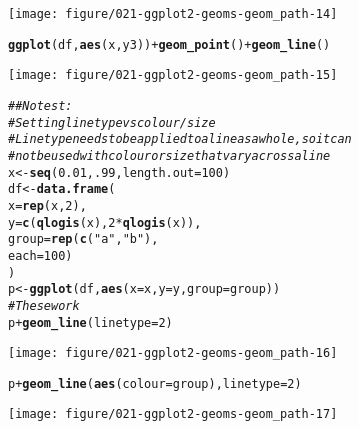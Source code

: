 \documentclass[a4paper,titlepage]{tufte-handout}\usepackage[]{graphicx}\usepackage[]{color}
\makeatletter
\def\maxwidth{ %
  \ifdim\Gin@nat@width>\linewidth
    \linewidth
  \else
    \Gin@nat@width
  \fi
}
\newcommand{\hlnum}[1]{\textcolor[rgb]{0.686,0.059,0.569}{#1}}%
\newcommand{\hlstr}[1]{\textcolor[rgb]{0.192,0.494,0.8}{#1}}%
\newcommand{\hlcom}[1]{\textcolor[rgb]{0.678,0.584,0.686}{\textit{#1}}}%
\newcommand{\hlopt}[1]{\textcolor[rgb]{0,0,0}{#1}}%
\newcommand{\hlstd}[1]{\textcolor[rgb]{0.345,0.345,0.345}{#1}}%
\newcommand{\hlkwb}[1]{\textcolor[rgb]{0.69,0.353,0.396}{#1}}%
\newcommand{\hlkwc}[1]{\textcolor[rgb]{0.333,0.667,0.333}{#1}}%
\newcommand{\hlkwd}[1]{\textcolor[rgb]{0.737,0.353,0.396}{\textbf{#1}}}%
\newenvironment{kframe}{%
 \def\at@end@of@kframe{}%
 \ifinner\ifhmode%
  \def\at@end@of@kframe{\end{minipage}}%
  \begin{minipage}{\columnwidth}%
 \fi\fi%
 \def\FrameCommand##1{\hskip\@totalleftmargin \hskip-\fboxsep
 \colorbox{shadecolor}{##1}\hskip-\fboxsep
     \hskip-\linewidth \hskip-\@totalleftmargin \hskip\columnwidth}%
 \MakeFramed {\advance\hsize-\width
   \@totalleftmargin\z@ \linewidth\hsize
   \@setminipage}}%
 {\par\unskip\endMakeFramed%
 \at@end@of@kframe}
\newenvironment{knitrout}{}{} %
\makeatother
\begin{document}
\begin{knitrout}
\begin{kframe}
{\ttfamily\noindent\color{warningcolor}{\#\# Warning: Removed 1 rows containing missing values (geom\_point).}}

{\ttfamily\noindent\color{warningcolor}{\#\# Warning: Removed 1 rows containing missing values (geom\_path).}}\end{kframe}
\texttt{[image: figure/021-ggplot2-geoms-geom\_path-14]} 
\begin{kframe}\begin{alltt}
\hlkwd{ggplot}\hlstd{(df,} \hlkwd{aes}\hlstd{(x, y3))} \hlopt{+} \hlkwd{geom_point}\hlstd{()} \hlopt{+} \hlkwd{geom_line}\hlstd{()}
\end{alltt}


{\ttfamily\noindent\color{warningcolor}{\#\# Warning: Removed 1 rows containing missing values (geom\_point).}}\end{kframe}
\texttt{[image: figure/021-ggplot2-geoms-geom\_path-15]} 
\begin{kframe}\begin{alltt}
\hlcom{## No test: }
\hlcom{# Setting line type vs colour/size}
\hlcom{# Line type needs to be applied to a line as a whole, so it can}
\hlcom{# not be used with colour or size that vary across a line}
\hlstd{x} \hlkwb{<-} \hlkwd{seq}\hlstd{(}\hlnum{0.01}\hlstd{,} \hlnum{.99}\hlstd{,} \hlkwc{length.out} \hlstd{=} \hlnum{100}\hlstd{)}
\hlstd{df} \hlkwb{<-} \hlkwd{data.frame}\hlstd{(}
  \hlkwc{x} \hlstd{=} \hlkwd{rep}\hlstd{(x,} \hlnum{2}\hlstd{),}
  \hlkwc{y} \hlstd{=} \hlkwd{c}\hlstd{(}\hlkwd{qlogis}\hlstd{(x),} \hlnum{2} \hlopt{*} \hlkwd{qlogis}\hlstd{(x)),}
  \hlkwc{group} \hlstd{=} \hlkwd{rep}\hlstd{(}\hlkwd{c}\hlstd{(}\hlstr{"a"}\hlstd{,}\hlstr{"b"}\hlstd{),}
  \hlkwc{each} \hlstd{=} \hlnum{100}\hlstd{)}
\hlstd{)}
\hlstd{p} \hlkwb{<-} \hlkwd{ggplot}\hlstd{(df,} \hlkwd{aes}\hlstd{(}\hlkwc{x}\hlstd{=x,} \hlkwc{y}\hlstd{=y,} \hlkwc{group}\hlstd{=group))}
\hlcom{# These work}
\hlstd{p} \hlopt{+} \hlkwd{geom_line}\hlstd{(}\hlkwc{linetype} \hlstd{=} \hlnum{2}\hlstd{)}
\end{alltt}
\end{kframe}
\texttt{[image: figure/021-ggplot2-geoms-geom\_path-16]} 
\begin{kframe}\begin{alltt}
\hlstd{p} \hlopt{+} \hlkwd{geom_line}\hlstd{(}\hlkwd{aes}\hlstd{(}\hlkwc{colour} \hlstd{= group),} \hlkwc{linetype} \hlstd{=} \hlnum{2}\hlstd{)}
\end{alltt}
\end{kframe}
\texttt{[image: figure/021-ggplot2-geoms-geom\_path-17]} 

\end{knitrout}
\end{document}
